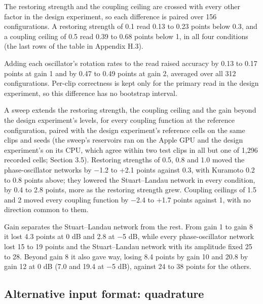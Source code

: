 \documentclass[10pt]{article}
\begin{document}
The restoring strength and the coupling ceiling are crossed with every
other factor in the design experiment, so each difference is paired over
156 configurations. A restoring strength of 0.1 read 0.13 to 0.23 points
below 0.3, and a coupling ceiling of 0.5 read 0.39 to 0.68 points below
1, in all four conditions (the last rows of the table in Appendix H.3).

Adding each oscillator's rotation rates to the read raised accuracy by
0.13 to 0.17 points at gain 1 and by 0.47 to 0.49 points at gain 2,
averaged over all 312 configurations. Per-clip correctness is kept only
for the primary read in the design experiment, so this difference has no
bootstrap interval.

A sweep extends the restoring strength, the coupling ceiling and the
gain beyond the design experiment's levels, for every coupling function
at the reference configuration, paired with the design experiment's
reference cells on the same clips and seeds (the sweep's reservoirs ran
on the Apple GPU and the design experiment's on its CPU, which agree
within two test clips in all but one of 1,296 recorded cells; Section
3.5). Restoring strengths of 0.5, 0.8 and 1.0 moved the phase-oscillator
networks by \ensuremath{-}1.2 to +2.1 points against 0.3, with Kuramoto
0.2 to 0.8 points above; they lowered the Stuart--Landau network in
every condition, by 0.4 to 2.8 points, more as the restoring strength
grew. Coupling ceilings of 1.5 and 2 moved every coupling function by
\ensuremath{-}2.4 to +1.7 points against 1, with no direction common to
them.

Gain separates the Stuart--Landau network from the rest. From gain 1 to
gain 8 it lost 4.3 points at 0 dB and 2.8 at \ensuremath{-}5 dB, while
every phase-oscillator network lost 15 to 19 points and the
Stuart--Landau network with its amplitude fixed 25 to 28. Beyond gain 8
it also gave way, losing 8.4 points by gain 10 and 20.8 by gain 12 at 0
dB (7.0 and 19.4 at \ensuremath{-}5 dB), against 24 to 38 points for the
others.

\subsection{Alternative input format:
quadrature}\label{alternative-input-format-quadrature}
\end{document}

